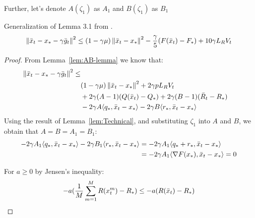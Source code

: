 Further, let's denote $A(\zeta_1)$ as $A_1$ and $B(\zeta_1)$ as $B_1$
\begin{lemma} \label{lem:main}
    Generalization of Lemma 3.1 from \cite{Stich}.
    \begin{align}
        \begin{split}
            \norm{\bar{x}_t - x_* - \gamma \bar{g}_t}^2 
            \leq (1 - \gamma \mu)\norm{\bar{x}_t - x_*}^2  - \frac{\gamma}{5} (F(\bar{x}_t) - F_*) + 10 \gamma L_R V_t
        \end{split}
    \end{align}
\end{lemma}
\begin{proof}
    From Lemma~\ref{lem:AB-lemma} we know that:
    \begin{align}
        \begin{split}
            \norm{\bar{x}_t - x_* - \gamma \bar{g}_t}^2 \leq \\
            &(1 - \gamma \mu)\norm{\bar{x}_t - x_*}^2 + 2 \gamma p L_R V_t \\
            &+ 2\gamma (A - 1)(Q(\bar{x}_t) - Q_*)
            + 2\gamma (B - 1)(\bar{R}_t - R_*) \\
            &- 2\gamma A \inner{q_*}{\bar{x}_t - x_*}
            - 2\gamma B \inner{r_*}{\bar{x}_t - x_*} \label{eq:main}
        \end{split}
    \end{align}
    Using the result of Lemma~\ref{lem:Technical}, and substituting $\zeta_1$ into $A$ and $B$, we obtain that $A = B = A_1 = B_1$:
    \begin{align}
        - 2\gamma A_1 \inner{q_*}{\bar{x}_t - x_*} - 2\gamma B_1 \inner{r_*}{\bar{x}_t - x_*} 
        &= - 2\gamma A_1 \inner{q_* + r_*}{\bar{x}_t - x_*} \\
        &= - 2\gamma A_1 \inner{\nabla F(x_*)}{\bar{x}_t - x_*} = 0 \label{eq:zero}
    \end{align}

    For $a \geq 0$ by Jensen's inequality:
    \begin{align}
        -a (\fsumm{m=1}{M}{R(x^m_t}) - R_*) \leq -a (R(\bar{x}_t) - R_*) \label{eq:jensen'} 
    \end{align}
    

\end{proof}
